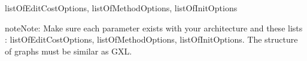 \documentclass[letterpaper,10pt,english]{sphinxmanual}
\begin{document}
\begin{fulllineitems}
\begin{quote}
\begin{description}
\end{description}\end{quote}




listOfEditCostOptions, listOfMethodOptions, listOfInitOptions



\begin{notice}{note}{Note:}
Make sure each parameter exists with your architecture and these lists : listOfEditCostOptions, listOfMethodOptions, listOfInitOptions. The structure of graphs must be similar as GXL.
\end{notice}

\end{fulllineitems}

\end{document}
